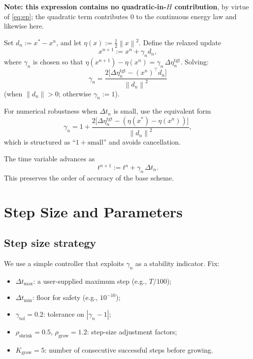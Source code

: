 \documentclass[11pt]{article}
\theoremstyle{definition}
\newcommand{\norm}[1]{\left\|#1\right\|}
\newcommand{\dt}{\Delta t}
\begin{document}
\textbf{Note: this expression contains no quadratic-in-$H$ contribution}, by virtue of \eqref{eq:ep}; the quadratic term contributes $0$ to the continuous energy law and likewise here.

Set $d_n := x^* - x^n$, and let $\eta(x) := \tfrac{1}{2}\norm{x}^2$. Define the relaxed update
\begin{equation}
\label{eq:relax-update}
x^{n+1} := x^n + \gamma_n d_n,
\end{equation}
where $\gamma_n$ is chosen so that $\eta(x^{n+1}) - \eta(x^n) = \gamma_n \, \Delta\eta^{\text{tgt}}_n$. Solving:
\begin{equation}
\label{eq:gamma}
\boxed{\;
\gamma_n = \frac{2\bigl[\Delta\eta^{\text{tgt}}_n - (x^n)^\top d_n\bigr]}{\norm{d_n}^2}
\;}
\end{equation}
(when $\norm{d_n} > 0$; otherwise $\gamma_n := 1$).

For numerical robustness when $\dt_n$ is small, use the equivalent form
\begin{equation}
\label{eq:gamma-stable}
\gamma_n = 1 + \frac{2\bigl[\Delta\eta^{\text{tgt}}_n - (\eta(x^*) - \eta(x^n))\bigr]}{\norm{d_n}^2},
\end{equation}
which is structured as ``$1 + \text{small}$'' and avoids cancellation.

The time variable advances as
\begin{equation}
\label{eq:time-update}
t^{n+1} := t^n + \gamma_n \, \dt_n.
\end{equation}
This preserves the order of accuracy of the base scheme.

\section{Step Size and Parameters}

\subsection{Step size strategy}

We use a simple controller that exploits $\gamma_n$ as a stability indicator. Fix:
\begin{itemize}[leftmargin=*]
    \item $\dt_{\max}$: a user-supplied maximum step (e.g., $T / 100$);
    \item $\dt_{\min}$: floor for safety (e.g., $10^{-10}$);
    \item $\gamma_{\text{tol}} = 0.2$: tolerance on $|\gamma_n - 1|$;
    \item $\rho_{\text{shrink}} = 0.5$, $\rho_{\text{grow}} = 1.2$: step-size adjustment factors;
    \item $K_{\text{grow}} = 5$: number of consecutive successful steps before growing.
\end{itemize}
\end{document}
